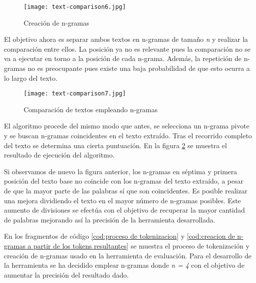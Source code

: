 \begin{figure}[tphb]
  \centering
  \texttt{[image: text-comparison6.jpg]}
  \caption{Creación de n-gramas}
  \label{img:creacion de n-gramas}
\end{figure}

El objetivo ahora es separar ambos textos en n-gramas de tamaño \emph{n} y realizar la comparación entre
ellos. La posición ya no es relevante pues la comparación no se va a ejecutar en torno a la posición de cada
n-grama. Además, la repetición de n-gramas no es preocupante pues existe una baja probabilidad de que esto
ocurra a lo largo del texto.

\begin{figure}[tphb]
  \centering
  \texttt{[image: text-comparison7.jpg]}
  \caption{Comparación de textos empleando n-gramas}
  \label{img:comparacion de textos empleando n-gramas p2}
\end{figure}

El algoritmo procede del mismo modo que antes, se selecciona un n-grama pivote y se buscan n-gramas
coincidentes en el texto extraído. Tras el recorrido completo del texto se determina una cierta puntuación.
En la figura \ref{img:comparacion de textos empleando n-gramas p2} se muestra el resultado de ejecución
del algoritmo.

Si observamos de nuevo la figura anterior, los n-gramas en séptima y primera posición del texto base no 
coincide con los n-gramas del texto extraído, a pesar de que la mayor parte de las palabras sí que son 
coincidentes. Es posible realizar una mejora dividiendo el texto en el mayor número de n-gramas posibles. 
Este aumento de divisiones se efectúa con el objetivo de recuperar la mayor cantidad de palabras mejorando 
así la precisión de la herramienta desarrollada.

\begin{codefloat}
  
  \caption{Proceso de tokenización}
  \label{cod:proceso de tokenizacion}
\end{codefloat}

En los fragmentos de código \ref{cod:proceso de tokenizacion} y
\ref{cod:creacion de n-gramas a partir de los tokens resultantes} se muestra el proceso de tokenización y
creación de n-gramas usado en la herramienta de evaluación. Para el desarrollo de la herramienta se ha
decidido emplear n-gramas donde \emph{n = 4} con el objetivo de aumentar la precisión del resultado dado.

